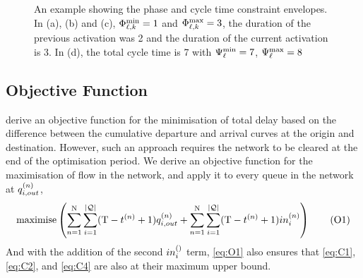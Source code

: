 \begin{figure*}[t!]
\centering
\caption{An example showing the phase and cycle time constraint envelopes. In (a), (b) and (c), $\PTMIN{\ell}{k}=1$ and $\PTMAX{\ell}{k}=3$, the duration of the previous activation was 2 and the duration of the current activation is 3. In (d), the total cycle time is 7 with $\CTMIN{\ell}=7$, $\CTMAX{\ell}=8$}
\label{fig:phase_plots}
\end{figure*}

\subsection{Objective Function}
 derive an objective function for the minimisation of total delay based on the difference between the cumulative departure and arrival curves at the origin and destination. However, such an approach requires the network to be cleared at the end of the optimisation period. We derive an objective function for the maximisation of flow in the network, and apply it to every queue in the network at $\qout{i}$,
\begin{equation}
\textrm{maximise} \left( \sum\limits_{n=1}^{\Nn} \sum\limits_{i=1}^{\Qn} (\TMAX - \tn + 1) \qout{i} + \sum\limits_{n=1}^{\Nn} \sum\limits_{i=1}^{\Qn} (\TMAX - \tn + 1) \inq{i} \right) 
\tag{O1}\label{eq:O1}
\end{equation}
And with the addition of the second $\inq[]{i}$ term, \ref{eq:O1} also ensures that \ref{eq:C1}, \ref{eq:C2}, and \ref{eq:C4} are also at their maximum upper bound.


